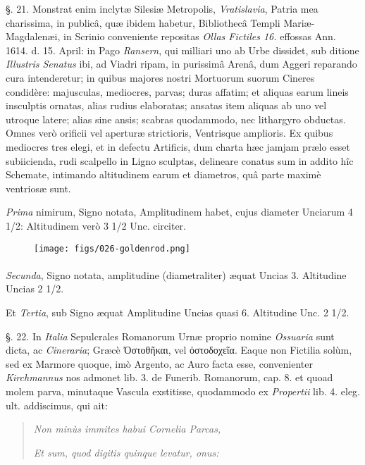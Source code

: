 \documentclass[a4paper, 11pt, oneside, polutonikogreek, german]{article}
\begin{document}
§. 21. Monstrat enim inclytæ Silesiæ Metropolis, \emph{Vratislavia}, Patria mea charissima, in publicâ, quæ ibidem habetur, Bibliothecâ Templi Mariæ-Magdalenæi, in Scrinio conveniente repositas \emph{Ollas Fictiles 16.} effossas Ann. 1614. d. 15. April: in Pago \emph{Ransern}, qui milliari uno ab Urbe dissidet, sub ditione \emph{Illustris Senatus} ibi, ad Viadri ripam, in purissimâ Arenâ, dum Aggeri reparando cura intenderetur; in quibus majores nostri Mortuorum suorum Cineres condidère: majusculas, mediocres, parvas; duras affatim; et aliquas earum lineis insculptis ornatas, alias rudius elaboratas; ansatas item aliquas ab uno vel utroque latere; alias sine ansis; scabras quodammodo, nec lithargyro obductas. Omnes verò orificii vel aperturæ strictioris, Ventrisque amplioris. Ex quibus mediocres tres elegi, et in defectu Artificis, dum charta hæc jamjam prælo esset subiicienda, rudi scalpello in Ligno sculptas, delineare conatus sum in addito hîc Schemate, intimando altitudinem earum et diametros, quâ parte maximè ventriosæ sunt.

\emph{Prima} nimirum, Signo \astrosun notata, Amplitudinem habet, cujus diameter Unciarum 4 1/2: Altitudinem verò 3 1/2 Unc. circiter.
\begin{figure}[H]
\centering
\texttt{[image: figs/026-goldenrod.png]}
\end{figure}
\paragraph{}

\emph{Secunda}, Signo \leftmoon notata, amplitudine (diametraliter) æquat Uncias 3. Altitudine Uncias 2 1/2.

Et \emph{Tertia}, sub Signo \EightStarTaper æquat Amplitudine Uncias quasi 6. Altitudine Unc. 2 1/2.

§. 22. In \emph{Italia} Sepulcrales Romanorum Urnæ proprio nomine \emph{Ossuaria} sunt dicta, ac \emph{Cineraria}; Græcè Ὀστοθῆκαι, vel ὀστοδοχεῖα. Eaque non Fictilia solùm, sed ex Marmore quoque, imò Argento, ac Auro facta esse, convenienter \emph{Kirchmannus} nos admonet lib. 3. de Funerib. Romanorum, cap. 8. et quoad molem parva, minutaque Vascula exstitisse, quodammodo ex \emph{Propertii} lib. 4. eleg. ult. addiscimus, qui ait:
\begin{quotation}
\emph{Non minùs immites habui Cornelia Parcas,}

\emph{Et sum, quod digitis quinque levatur, onus:}
\end{quotation}
\end{document}
